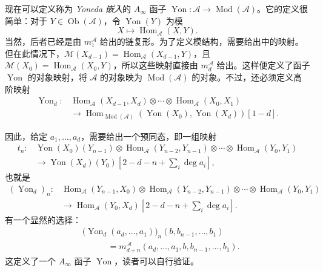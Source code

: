 现在可以定义称为 \emph{Yoneda 嵌入}的 $A_\infty$ 函子 $\operatorname{Yon}\colon\mathcal A\to\operatorname{Mod}(\mathcal A)$。它的定义很简单：对于 $Y\in\operatorname{Ob}(\mathcal A)$，令 $\operatorname{Yon}(Y)$ 为模
\[
X\longmapsto\operatorname{Hom}_{\mathcal A}(X,Y).
\]
当然，后者已经是由 $m_1^{\mathcal A}$ 给出的链复形。为了定义模结构，需要给出中的映射。但在此情况下，$\mathcal M(X_{d-1})=\operatorname{Hom}_{\mathcal A}(X_{d-1},Y)$，且 $\mathcal M(X_0)=\operatorname{Hom}_{\mathcal A}(X_0,Y)$，所以这些映射直接由 $m_d^{\mathcal A}$ 给出。这样便定义了函子 $\operatorname{Yon}$ 的对象映射，将 $\mathcal A$ 的对象映为 $\operatorname{Mod}(\mathcal A)$ 的对象。不过，还必须定义高阶映射
\[
\begin{aligned}
\operatorname{Yon}_d\colon{}&\operatorname{Hom}_{\mathcal A}(X_{d-1},X_d)
\otimes\cdots\otimes\operatorname{Hom}_{\mathcal A}(X_0,X_1)\\
&\longrightarrow
\operatorname{Hom}_{\operatorname{Mod}(\mathcal A)}
(\operatorname{Yon}(X_0),\operatorname{Yon}(X_d))[1-d].
\end{aligned}
\]

因此，给定 $a_1,\ldots,a_d$，需要给出一个预同态，即一组映射
\[
\begin{aligned}
t_n\colon&\operatorname{Yon}(X_0)(Y_{n-1})\otimes
\operatorname{Hom}_{\mathcal A}(Y_{n-2},Y_{n-1})\otimes\cdots
\otimes\operatorname{Hom}_{\mathcal A}(Y_0,Y_1)\\
&\longrightarrow\operatorname{Yon}(X_d)(Y_0)
\left[2-d-n+\sum_i\deg a_i\right],
\end{aligned}
\]
也就是
\[
\begin{aligned}
(\operatorname{Yon}_d)_n\colon&\operatorname{Hom}_{\mathcal A}(Y_{n-1},X_0)
\otimes\operatorname{Hom}_{\mathcal A}(Y_{n-2},Y_{n-1})\otimes\cdots
\otimes\operatorname{Hom}_{\mathcal A}(Y_0,Y_1)\\
&\longrightarrow\operatorname{Hom}_{\mathcal A}(Y_0,X_d)
\left[2-d-n+\sum_i\deg a_i\right].
\end{aligned}
\]
有一个显然的选择：
\[
\begin{aligned}
&\bigl(\operatorname{Yon}_d(a_d,\ldots,a_1)\bigr)_n(b,b_{n-1},\ldots,b_1)\\
&\hspace{3em}=m_{d+n}^{\mathcal A}(a_d,\ldots,a_1,b,b_{n-1},\ldots,b_1).
\end{aligned}
\]
这定义了一个 $A_\infty$ 函子 $\operatorname{Yon}$，读者可以自行验证。

